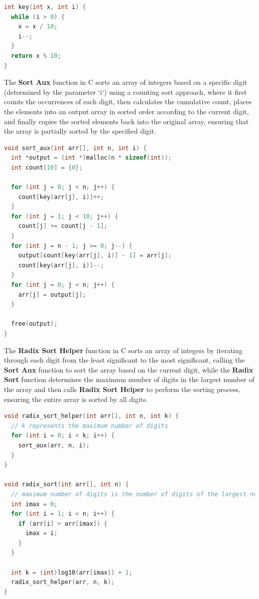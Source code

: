 \documentclass{article}
\begin{document}
\begin{lstlisting}[language=C, caption=Key implementation]
int key(int x, int i) {
  while (i > 0) {
    x = x / 10;
    i--;
  }
  return x % 10;
}
\end{lstlisting}

The \textbf{Sort Aux} function in C sorts an array of integers based on a specific digit (determined by the parameter `i`) using a counting sort approach, where it first counts the occurrences of each digit, then calculates the cumulative count, places the elements into an output array in sorted order according to the current digit, and finally copies the sorted elements back into the original array, ensuring that the array is partially sorted by the specified digit.

\begin{lstlisting}[language=C, caption=Sort Aux implementation]
void sort_aux(int arr[], int n, int i) {
  int *output = (int *)malloc(n * sizeof(int));
  int count[10] = {0};

  for (int j = 0; j < n; j++) {
    count[key(arr[j], i)]++;
  }
  for (int j = 1; j < 10; j++) {
    count[j] += count[j - 1];
  }
  for (int j = n - 1; j >= 0; j--) {
    output[count[key(arr[j], i)] - 1] = arr[j];
    count[key(arr[j], i)]--;
  }
  for (int j = 0; j < n; j++) {
    arr[j] = output[j];
  }

  free(output);
}
\end{lstlisting}

\newpage
The \textbf{Radix Sort Helper} function in C sorts an array of integers by iterating through each digit from the least significant to the most significant, calling the \textbf{Sort Aux} function to sort the array based on the current digit, while the \textbf{Radix Sort} function determines the maximum number of digits in the largest number of the array and then calls \textbf{Radix Sort Helper} to perform the sorting process, ensuring the entire array is sorted by all digits.

\begin{lstlisting}[language=C, caption=Radix Sort implementation]
void radix_sort_helper(int arr[], int n, int k) {
  // k represents the maximum number of digits
  for (int i = 0; i < k; i++) {
    sort_aux(arr, n, i);
  }
}

void radix_sort(int arr[], int n) {
  // maximum number of digits is the number of digits of the largest number
  int imax = 0;
  for (int i = 1; i < n; i++) {
    if (arr[i] > arr[imax]) {
      imax = i;
    }
  }

  int k = (int)log10(arr[imax]) + 1;
  radix_sort_helper(arr, n, k);
}
\end{lstlisting}
\end{document}
